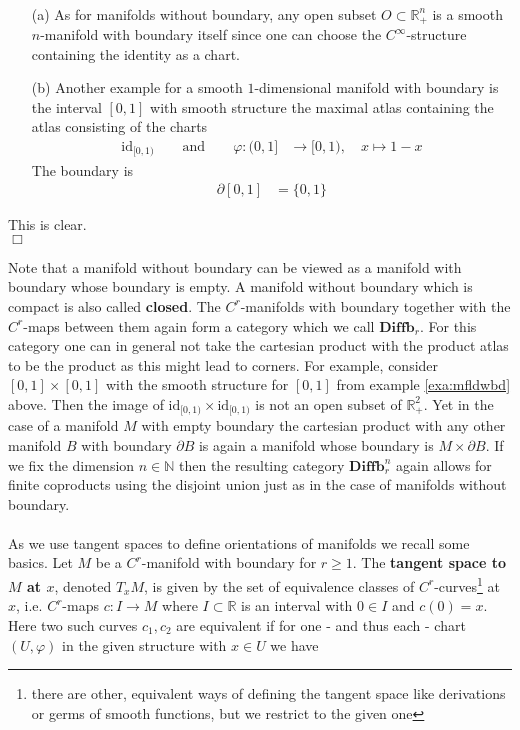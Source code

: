 \\
\begin{exa}
\label{exa:mfldwbd}
\begin{enumerate}
\item[(a)]
As for manifolds without boundary, any open subset $O \subset \mathbb{R}_{+}^{n}$ is a smooth $n$-manifold with boundary itself since one can choose the $C^{\infty}$-structure containing the identity as a chart.

\item[(b)]
Another example for a smooth $1$-dimensional manifold with boundary is the interval $[0,1]$ with smooth structure the maximal atlas containing the atlas consisting of the charts
\begin{align*}
  \mathrm{id}_{[0,1)}
  \qquad
  \text{and}
  \qquad
  \varphi
  \colon
  (0,1]
  &\to
  [0,1)
  ,\quad
  x
  \mapsto
  1 - x
\end{align*}
The boundary is
\begin{align*}
  \partial[0,1]
  &=
  \lbrace
    0,1
  \rbrace
\end{align*}
\end{enumerate}
\end{exa}
\begin{prf}
This is clear.
\\
\phantom{proven}
\hfill
$\Box$
\end{prf}
Note that a manifold without boundary can be viewed as a manifold with boundary whose boundary is empty. A manifold without boundary which is compact is also called \textbf{closed}. The $C^{r}$-manifolds with boundary together with the $C^{r}$-maps between them again form a category which we call $\mathbf{Diffb}_{r}$. For this category one can in general not take the cartesian product with the product atlas to be the product as this might lead to corners. For example, consider $[0,1] \times [0,1]$ with the smooth structure for $[0,1]$ from example \ref{exa:mfldwbd} above. Then the image of $\mathrm{id}_{[0,1)} \times \mathrm{id}_{[0,1)}$ is not an open subset of $\mathbb{R}_{+}^{2}$. Yet in the case of a manifold $M$ with empty boundary the cartesian product with any other manifold $B$ with boundary $\partial B$ is again a manifold whose boundary is $M \times \partial B$. If we fix the dimension $n \in \mathbb{N}$ then the resulting category $\mathbf{Diffb}_{r}^{n}$ again allows for finite coproducts using the disjoint union just as in the case of manifolds without boundary.
\\\\
As we use tangent spaces to define orientations of manifolds we recall some basics. Let $M$ be a $C^{r}$-manifold with boundary for $r \geq 1$. The \textbf{tangent space to $M$ at $x$}, denoted $T_{x}M$, is given by the set of equivalence classes of $C^{r}$-curves\footnote{there are other, equivalent ways of defining the tangent space like derivations or germs of smooth functions, but we restrict to the given one} at $x$, i.e. $C^{r}$-maps $c \colon I \to M$ where $I \subset \mathbb{R}$ is an interval with $0 \in I$ and $c(0) = x$. Here two such curves $c_{1},c_{2}$ are equivalent if for one - and thus each - chart $(U,\varphi)$ in the given structure with $x \in U$ we have
